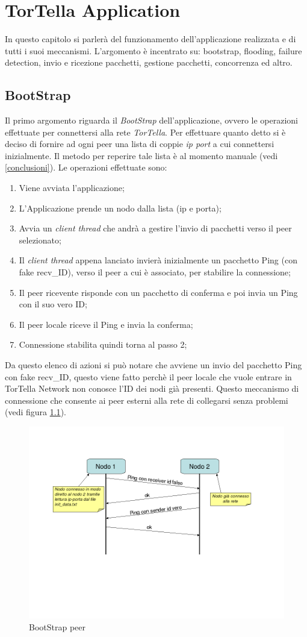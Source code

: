 \chapter{TorTella Application}
In questo capitolo si parlerà del funzionamento dell'applicazione realizzata e di tutti i suoi meccanismi. L'argomento è incentrato su: bootstrap, flooding, failure detection, invio e ricezione pacchetti, gestione pacchetti, concorrenza ed altro.
\section{BootStrap}
Il primo argomento riguarda il \textit{BootStrap} dell'applicazione, ovvero le operazioni effettuate per connettersi alla rete \textit{TorTella}. Per effettuare quanto detto si è deciso di fornire ad ogni peer una lista di coppie \textit{ip port} a cui connettersi inizialmente. Il metodo per reperire tale lista è al momento manuale (vedi \ref{conclusioni}). Le operazioni effettuate sono:
\begin{enumerate}
\item Viene avviata l'applicazione;
\item L'Applicazione prende un nodo dalla lista (ip e porta);
\item Avvia un \textit{client thread} che andrà a gestire l'invio di pacchetti verso il peer selezionato;
\item Il \textit{client thread} appena lanciato invierà inizialmente un pacchetto Ping (con fake recv\_ID), verso il peer a cui è associato, per stabilire la connessione;
\item Il peer ricevente risponde con un pacchetto di conferma e poi invia un Ping con il suo vero ID;
\item Il peer locale riceve il Ping e invia la conferma;
\item Connessione stabilita quindi torna al passo 2;
\end{enumerate}
Da questo elenco di azioni si può notare che avviene un invio del pacchetto Ping con fake recv\_ID, questo viene fatto perchè il peer locale che vuole entrare in TorTella Network non conosce l'ID dei nodi già presenti. Questo meccanismo di connessione che consente ai peer esterni alla rete di collegarsi senza problemi (vedi figura \ref{bootstrap}).
\begin{figure}[H]
\begin{center}
\includegraphics[scale=0.5]{etc/Bootstrap_conn.png}
\caption{BootStrap peer}
\label{bootstrap}
\end{center}
\end{figure}